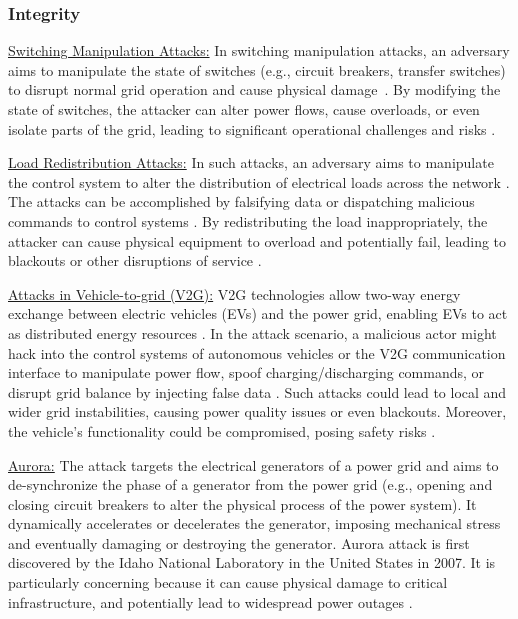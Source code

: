 \documentclass[10pt, journal]{IEEEtran}
\begin{document}
\subsubsection{Integrity}

\underline{Switching Manipulation Attacks:} In switching manipulation attacks, an adversary aims to manipulate the state of switches (e.g., circuit breakers, transfer switches) to disrupt normal grid operation and cause physical damage~\cite{liu2013framework,liu2011switched,liu2011class,liu2012smart, liu2012coordinated}. By modifying the state of switches, the attacker can alter power flows, cause overloads, or even isolate parts of the grid, leading to significant operational challenges and risks \cite{wu2019optimal}.

\underline{Load Redistribution Attacks:} In such attacks, an adversary aims to manipulate the control system to alter the distribution of electrical loads across the network \cite{lee2019vulnerability,xiang2016power}. The attacks can be accomplished by falsifying data or dispatching malicious commands to control systems \cite{yuan2012quantitative}. By redistributing the load inappropriately, the attacker can cause physical equipment to overload and potentially fail, leading to blackouts or other disruptions of service \cite{yuan2011modeling}.
			
\underline{Attacks in Vehicle-to-grid (V2G):} V2G technologies allow two-way energy exchange between electric vehicles (EVs) and the power grid, enabling EVs to act as distributed energy resources \cite{saxena2017network}. In the attack scenario, a malicious actor might hack into the control systems of autonomous vehicles or the V2G communication interface to manipulate power flow, spoof charging/discharging commands, or disrupt grid balance by injecting false data \cite{zhang2013securing}. Such attacks could lead to local and wider grid instabilities, causing power quality issues or even blackouts. Moreover, the vehicle's functionality could be compromised, posing safety risks \cite{han2016privacy}.

\underline{Aurora:} The attack targets the electrical generators of a power grid and aims to de-synchronize the phase of a generator from the power grid (e.g., opening and closing circuit breakers to alter the physical process of the power system). It dynamically accelerates or decelerates the generator, imposing mechanical stress and eventually damaging or destroying the generator. Aurora attack is first discovered by the Idaho National Laboratory in the United States in 2007. It is particularly concerning because it can cause physical damage to critical infrastructure, and potentially lead to widespread power outages \cite{zeller2011myth,srivastava2013modeling,zeller2011common,he2016cyber}. 
\end{document}
